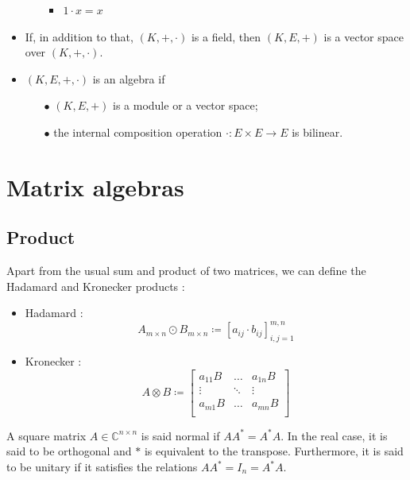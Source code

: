 \documentclass[12pt, openany]{report}
\theoremstyle{definition}
\begin{document}
\begin{itemize}
\begin{itemize}
\begin{itemize}
            \item \(1\cdot x = x\)
        \end{itemize}
    \end{itemize}
    \item If, in addition to that, \((K,+,\cdot)\) is a field, then \((K,E,+)\) is a vector space over \((K,+,\cdot)\).
    \item \((K,E,+,\cdot)\) is an algebra if 
    \begin{itemize}
        \item [\(\bullet\)] \((K,E,+)\) is a module or a vector space;
        \item [\(\bullet\)] the internal composition operation \(\cdot:E\times E\rightarrow E\) is bilinear.
    \end{itemize}
\end{itemize}
\section{Matrix algebras}
\subsection{Product}
Apart from the usual sum and product of two matrices, we can define the Hadamard and Kronecker products :
\begin{itemize}
    \item Hadamard : \[A_{m\times n}\odot B_{m\times n} \coloneqq [a_{ij}\cdot b_{ij}]_{i,j=1}^{m,n}\]
    \item Kronecker : \[A \otimes B \coloneqq \begin{bmatrix}
        a_{11}B & \dots & a_{1n}B\\
        \vdots & \ddots & \vdots \\
        a_{m1}B & \dots & a_{mn}B\\
    \end{bmatrix}\]
\end{itemize}
A square matrix \(A\in \mathbb{C}^{n\times n}\) is said normal if \(AA^* = A^*A\). In the real case, it is said to be orthogonal and \(*\) is equivalent to the transpose. Furthermore, it is said to be unitary if it satisfies the relations \(AA^* = I_n = A^*A\). 
\end{document}
